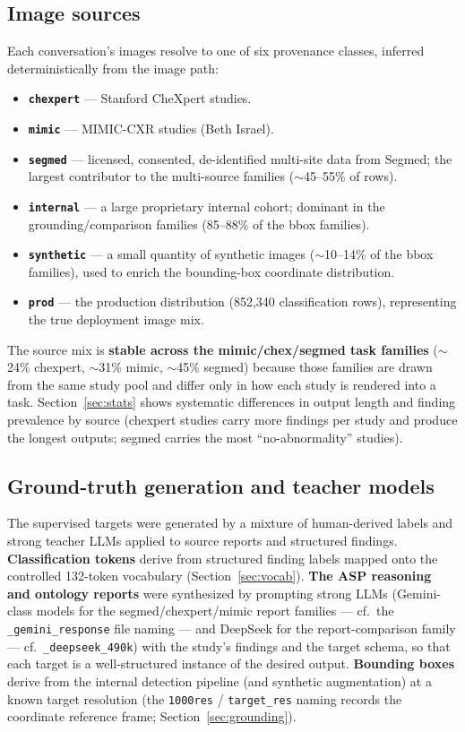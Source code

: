 \documentclass[11pt,a4paper]{article}
\begin{document}
\subsection{Image sources}
Each conversation's images resolve to one of six provenance classes, inferred deterministically from the image path:
\begin{itemize}[leftmargin=1.4em]
  \item \textbf{\texttt{chexpert}} --- Stanford CheXpert studies.
  \item \textbf{\texttt{mimic}} --- MIMIC-CXR studies (Beth Israel).
  \item \textbf{\texttt{segmed}} --- licensed, consented, de-identified multi-site data from Segmed; the largest contributor to the multi-source families ($\sim$45--55\% of rows).
  \item \textbf{\texttt{internal}} --- a large proprietary internal cohort; dominant in the grounding/comparison families (85--88\% of the bbox families).
  \item \textbf{\texttt{synthetic}} --- a small quantity of synthetic images ($\sim$10--14\% of the bbox families), used to enrich the bounding-box coordinate distribution.
  \item \textbf{\texttt{prod}} --- the production distribution (852{,}340 classification rows), representing the true deployment image mix.
\end{itemize}
The source mix is \textbf{stable across the mimic/chex/segmed task families} ($\sim$24\% chexpert, $\sim$31\% mimic, $\sim$45\% segmed) because those families are drawn from the same study pool and differ only in how each study is rendered into a task. Section~\ref{sec:stats} shows systematic differences in output length and finding prevalence by source (chexpert studies carry more findings per study and produce the longest outputs; segmed carries the most ``no-abnormality'' studies).

\subsection{Ground-truth generation and teacher models}
The supervised targets were generated by a mixture of human-derived labels and strong teacher LLMs applied to source reports and structured findings. \textbf{Classification tokens} derive from structured finding labels mapped onto the controlled 132-token vocabulary (Section~\ref{sec:vocab}). \textbf{The ASP reasoning and ontology reports} were synthesized by prompting strong LLMs (Gemini-class models for the segmed/chexpert/mimic report families --- cf.\ the \texttt{\_gemini\_response} file naming --- and DeepSeek for the report-comparison family --- cf.\ \texttt{\_deepseek\_490k}) with the study's findings and the target schema, so that each target is a well-structured instance of the desired output. \textbf{Bounding boxes} derive from the internal detection pipeline (and synthetic augmentation) at a known target resolution (the \texttt{1000res} / \texttt{target\_res} naming records the coordinate reference frame; Section~\ref{sec:grounding}).
\end{document}
